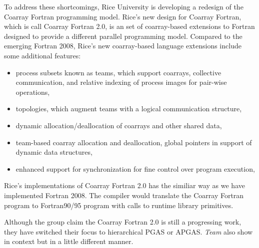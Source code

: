 To address these shortcomings, Rice University is developing a redesign of the Coarray Fortran programming model. Rice's new design for Coarray Fortran, which is call Coarray Fortran 2.0, is an set of coarray-based extensions to Fortran designed to provide a different parallel programming model. Compared to the emerging Fortran 2008, Rice's new coarray-based language extensions include some additional features:
\begin{itemize}
\item process subsets known as teams, which support coarrays, collective communication, and relative indexing of process images for pair-wise operations, 
\item topologies, which augment teams with a logical communication structure,
\item dynamic allocation/deallocation of coarrays and other shared data,
\item team-based coarray allocation and deallocation, global pointers in support of dynamic data structures, \item enhanced support for synchronization for fine control over program execution,
\end{itemize}

Rice's implementations of Coarray Fortran 2.0 has the similiar way as we have implemented Fortran 2008. The compiler would translate the Coarray Fortran program to Fortran90/95 program with calls to runtime library primitives. 

Although the group claim the Coarray Fortran 2.0 is still a progressing work, they have switched their focus to hierarchical PGAS or APGAS. \textit{Team} also show in context but in a little different manner. 
